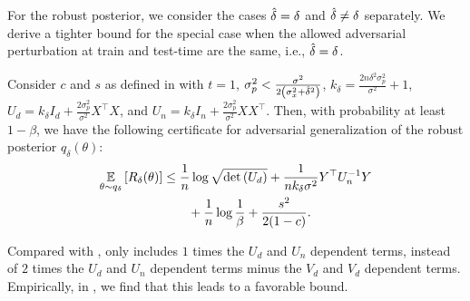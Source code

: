 For the robust posterior, we consider the cases $\deltat=\delta$ and $\hat{\delta}\neq\delta$ separately. We derive a tighter bound for the special case when the allowed adversarial perturbation at train and test-time are the same, i.e., $\deltat = \delta$. 
\begin{theorem}[Adversarial generalization of robust posterior with $\deltat=\delta$] \label{thm:adv_post_adv_loss}
Consider $c$ and $s$ as defined in  with $t=1$, $\sigma_p^2 < \frac{\sigma^2}{2 \left( \sigma_x^2 + \hat{\delta}^2\right)}$,
$k_\delta = \frac{2n\delta^2\sigma_p^2}{\sigma^2} + 1$, 
$U_d= k_\delta I_d + \frac{2\sigma_p^2}{\sigma^2} X^\top X$, and $U_n= k_\delta I_n + \frac{2\sigma_p^2}{\sigma^2} XX^\top$. 
Then, with probability at least $1-\beta$, we have the following certificate for adversarial generalization of the robust posterior $  {q}_\delta(\theta)$: 
\begin{align}
\underset{  \theta \sim {q}_\delta}{\mathbb{E}}\left[  {R}_\delta(\theta)\right]  &\leq \frac{1}{n} \log \sqrt{\det \left( U_d \right)} + \frac{1}{n k_\delta \sigma^2} Y^\top U_n^{-1} Y  \nonumber \\
&\qquad + \frac{1}{n} \log \frac{1}{\beta}  +\frac{s^2}{2(1-c)}. \label{eq:pac_bayes_adv_post_adv_loss}
\end{align}
\end{theorem}
Compared with ,  only includes $1$ times the $U_d$ and $U_n$ dependent terms, instead of $2$ times the $U_d$ and $U_n$ dependent terms minus the $V_d$ and $V_d$ dependent terms. 
Empirically, in , we find that this leads to a favorable bound.




